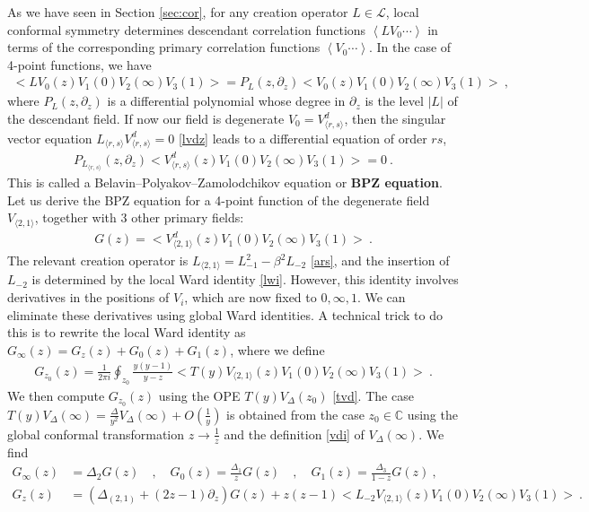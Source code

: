 \documentclass[12pt, a4paper]{article}
\newcommand{\myindex}[1]{\textbf{\boldmath #1}}
\begin{document}
As we have seen in Section \ref{sec:cor}, for any creation operator $L\in\mathcal{L}$, local conformal symmetry determines descendant correlation functions $\left<LV_0\cdots \right>$ in terms of the corresponding primary correlation functions $\left<V_0\cdots \right>$.
In the case of 4-point functions, we have 
\begin{align}
 \Big<LV_0(z)V_1(0)V_2(\infty)V_3(1)\Big> = P_L(z,\partial_z) \Big<V_0(z)V_1(0)V_2(\infty)V_3(1)\Big>\ ,
\end{align}
where $P_L(z,\partial_z)$ is a differential polynomial whose degree in $\partial_z$ is the level $|L|$ of the descendant field. If now our field is degenerate $V_0= V^d_{\langle r,s\rangle}$, then the singular vector equation $L_{\langle r,s\rangle}V^d_{\langle r,s\rangle}=0$ \eqref{lvdz} leads to a differential equation of order $rs$,
\begin{align}
 P_{L_{\langle r,s\rangle}}(z,\partial_z) \Big<V^d_{\langle r,s\rangle}(z)V_1(0)V_2(\infty)V_3(1)\Big> = 0\ .
\end{align}
This is called a Belavin--Polyakov--Zamolodchikov equation or \myindex{BPZ equation}.  
Let us derive the BPZ equation for a 4-point function  of the degenerate field $V_{\langle 2,1\rangle}$, together with 3 other primary fields:
\begin{align}
 G(z)=\Big<V_{\langle 2,1\rangle}^d(z)V_{1}(0)V_{2}(\infty)V_{3}(1)\Big>\ .
 \label{goz}
\end{align}
The relevant creation operator is $L_{\langle 2,1\rangle} = L_{-1}^2 -\beta^2L_{-2}$ \eqref{ars}, and the insertion of $L_{-2}$ is determined by the local Ward identity \eqref{lwi}. However, this identity involves derivatives in the positions of $V_{i}$, which are now fixed to $0,\infty,1$. We can eliminate these derivatives using global Ward identities. A technical trick to do this is to rewrite the local Ward identity as $G_\infty(z) = G_{z}(z) + G_0(z) + G_1(z)$, where we define
\begin{align}
 G_{z_0}(z) = \frac{1}{2\pi i} \oint_{z_0} \frac{y(y-1)}{y-z} \Big< T(y)V_{\langle 2,1\rangle}(z)V_{1}(0)V_{2}(\infty)V_{3}(1)\Big> \ .
\end{align}
We then compute $G_{z_0}(z)$ using the OPE $T(y)V_\Delta(z_0)$ \eqref{tvd}. The case $T(y)V_\Delta(\infty) = \frac{\Delta}{y^2} V_\Delta(\infty) + O(\frac{1}{y})$ is obtained from the case $z_0\in\mathbb{C}$ using the global conformal transformation $z\to \frac{1}{z}$ and the definition \eqref{vdi} of $V_\Delta(\infty)$. We find 
\begin{subequations}
\begin{align}
 G_\infty(z) &= \Delta_2 G(z) \quad , \quad G_0(z) = \frac{\Delta_1}{z}G(z)\quad , \quad G_1(z) = \frac{\Delta_3}{1-z}G(z)\ ,
 \\
 G_z(z) &= \left(\Delta_{(2,1)} + (2z-1)\partial_z\right) G(z) + z(z-1)\Big<L_{-2}V_{\langle 2,1\rangle}(z)V_{1}(0)V_{2}(\infty)V_{3}(1)\Big>
 \ .
\end{align}
\end{subequations}
\end{document}
